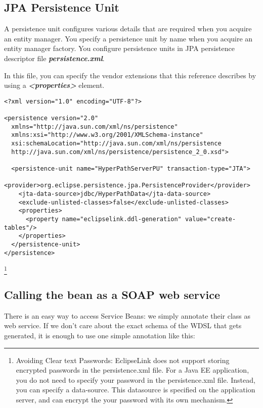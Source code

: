 \subsection{JPA Persistence Unit}
A persistence unit configures various details that are required when you acquire an entity manager. You specify a persistence unit by name when you acquire an entity manager factory. You configure persistence units in JPA persistence descriptor file \textbf{\textit{\textsf{persistence.xml}}}. 

In this file, you can specify the vendor extensions that this reference describes by using a \textit{\textbf{\textsf{<properties>}}} element.

\begin{lstlisting}[label=Persistence unit persistence.xml,caption=Persistence unit persistence.xml]
<?xml version="1.0" encoding="UTF-8"?>

<persistence version="2.0" 
  xmlns="http://java.sun.com/xml/ns/persistence" 
  xmlns:xsi="http://www.w3.org/2001/XMLSchema-instance"
  xsi:schemaLocation="http://java.sun.com/xml/ns/persistence
  http://java.sun.com/xml/ns/persistence/persistence_2_0.xsd">
  
  <persistence-unit name="HyperPathServerPU" transaction-type="JTA">
    <provider>org.eclipse.persistence.jpa.PersistenceProvider</provider>
    <jta-data-source>jdbc/HyperPathData</jta-data-source>
    <exclude-unlisted-classes>false</exclude-unlisted-classes>
    <properties>
      <property name="eclipselink.ddl-generation" value="create-tables"/>
    </properties>
  </persistence-unit>
</persistence>
\end{lstlisting}

\footnote{Avoiding Clear text Passwords: EclipseLink does not support storing encrypted passwords in the persistence.xml file. For a Java EE application, you do not need to specify your password in the persistence.xml file. Instead, you can specify a data-source. This datasource is specified on the application server, and can encrypt the your password with its own mechanism.
} 

\subsection{Calling the bean as a SOAP web service}
There is an easy way to access Service Beans: we simply annotate their class as web service. If we don’t care about the exact schema of the WDSL that gets generated, it is enough to use one simple annotation like this:

